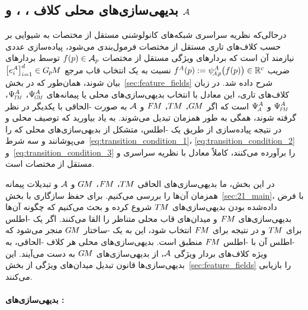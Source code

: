 

\subsection%
[بدیهی‌سازی‌های محلی کلاف \texorpdfstring{\lr{\textit{TM}}، \lr{\textit{FM}}، \lr{\textit{GM}} و $ \A $}{TM, GM and A}]%
{بدیهی‌سازی‌های محلی کلاف \texorpdfstring{، ،  و $\A$}{TM, GM and A}}
\label{sec:bundle_trivializations}

درحالی‌که نظریه سراسری شبکه‌های کانولوشنی مستقل از مختصات به شیوایی بر حسب کلاف‌های تاری مستقل از مختصات فرمول‌بندی می‌شود، پیاده‌سازی عددی نیازمند آن است که بردارهای ویژگی مستقل از مختصات $f(p)\in\mathcal{A}_p$ توسط بردارهای ضریب ${f^A(p):=\psiAp^A\big(f(p)\big)\in\R^c}$ نسبت به یک انتخاب قاب مرجع $\big[e_{i}^A\big]_{i=1}^d\in G_{\mkern-1.3mu p}\mkern-1.2muM$ بیان شوند، همان‌طور که در بخش~\ref{sec:feature_fields} شرح داده شد.
در زبان کلاف‌های تاری، این معادل با انتخاب بدیهی‌سازی‌های محلی یا پیمانه‌های $\PsiGM^A$، $\PsiTM^A$، $\PsiFM^A$ و $\PsiA^A$ است که اگر $G\mkern-1.4muM$، $T\mkern-1.5muM$، $F\mkern-1.5muM$ و $\A$ به صورت -الحاقی با یکدیگر در نظر گرفته شوند، همگی به طور همزمان تبدیل می‌شوند.
به یاد بیاورید که توصیف محلی و در نتیجه پیاده‌سازی از طریق یک -اطلس، متشکل از بدیهی‌سازی‌های محلی که  را می‌پوشانند و سه شرط~\eqref{eq:transition_condition_1}، \eqref{eq:transition_condition_2} و~\eqref{eq:transition_condition_3} را برآورده می‌کنند، کاملاً معادل با نظریه سراسری و مستقل از مختصات است.


در این بخش، ما بدیهی‌سازی‌های الحاقی $T\mkern-1.5muM$، $F\mkern-1.5muM$، $G\mkern-1.4muM$ و $\A$ و تبدیلات پیمانه همزمان آن‌ها را بررسی می‌کنیم.
برای حفظ سازگاری با بخش~\ref{sec:21_main}، با فرض داده‌شده بودن بدیهی‌سازی‌های $T\mkern-1.5muM$ شروع کرده و بحث می‌کنیم که چگونه آن‌ها بدیهی‌سازی‌های $F\mkern-1.5muM$ و میدان‌های قاب محلی متناظر را القا می‌کنند.
اگر یک -اطلس برای $T\mkern-1.5muM$ و در نتیجه برای $F\mkern-1.5muM$ انتخاب شود، این به یک -ساختار $G\mkern-1.4muM$ منجر می‌شود که -اطلس آن با -اطلس $F\mkern-1.5muM$ منطبق است.
بدیهی‌سازی‌های محلی هر کلاف -الحاقی، به ویژه کلاف‌های بردار ویژگی $\A$، از بدیهی‌سازی‌های $G\mkern-1.4muM$ به دست می‌آیند.
این بدیهی‌سازی‌ها قانون تبدیل میدان‌های ویژگی از بخش~\ref{sec:feature_fields} را بازیابی می‌کنند.







\paragraph{بدیهی‌سازی‌های :}

